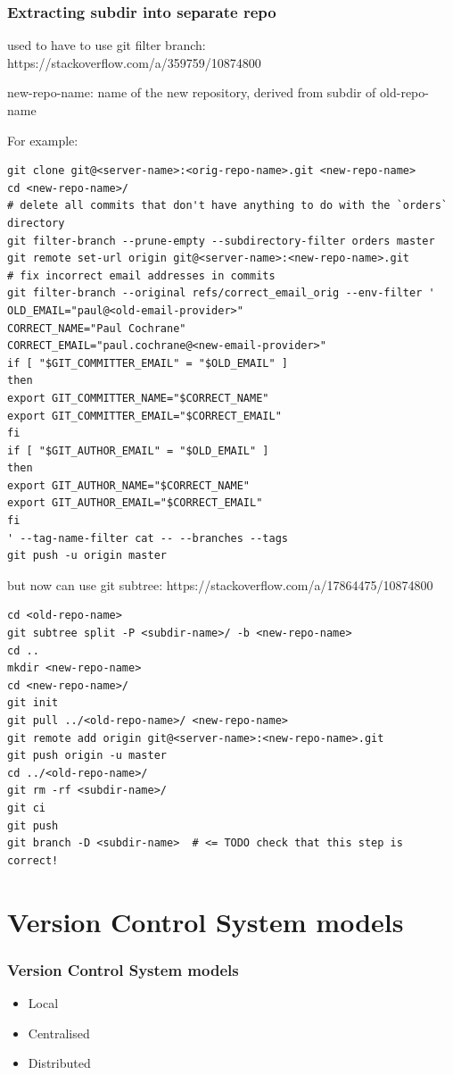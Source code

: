 \documentclass{git_course}
\begin{document}
\begin{frame}[fragile]
\frametitle{Extracting subdir into separate repo}
used to have to use git filter branch:
    https://stackoverflow.com/a/359759/10874800

    new-repo-name: name of the new repository, derived from subdir of
    old-repo-name

For example:
    \begin{lstlisting}
git clone git@<server-name>:<orig-repo-name>.git <new-repo-name>
cd <new-repo-name>/
# delete all commits that don't have anything to do with the `orders` directory
git filter-branch --prune-empty --subdirectory-filter orders master
git remote set-url origin git@<server-name>:<new-repo-name>.git
# fix incorrect email addresses in commits
git filter-branch --original refs/correct_email_orig --env-filter '
OLD_EMAIL="paul@<old-email-provider>"
CORRECT_NAME="Paul Cochrane"
CORRECT_EMAIL="paul.cochrane@<new-email-provider>"
if [ "$GIT_COMMITTER_EMAIL" = "$OLD_EMAIL" ]
then
export GIT_COMMITTER_NAME="$CORRECT_NAME"
export GIT_COMMITTER_EMAIL="$CORRECT_EMAIL"
fi
if [ "$GIT_AUTHOR_EMAIL" = "$OLD_EMAIL" ]
then
export GIT_AUTHOR_NAME="$CORRECT_NAME"
export GIT_AUTHOR_EMAIL="$CORRECT_EMAIL"
fi
' --tag-name-filter cat -- --branches --tags
git push -u origin master
    \end{lstlisting}

but now can use git subtree:
    https://stackoverflow.com/a/17864475/10874800

\begin{lstlisting}
cd <old-repo-name>
git subtree split -P <subdir-name>/ -b <new-repo-name>
cd ..
mkdir <new-repo-name>
cd <new-repo-name>/
git init
git pull ../<old-repo-name>/ <new-repo-name>
git remote add origin git@<server-name>:<new-repo-name>.git
git push origin -u master
cd ../<old-repo-name>/
git rm -rf <subdir-name>/
git ci
git push
git branch -D <subdir-name>  # <= TODO check that this step is correct!
\end{lstlisting}
\end{frame}

\appendix

\section{Version Control System models}

\begin{frame}
    \frametitle{Version Control System models}
    \begin{itemize}
        \item Local
        \item Centralised
        \item Distributed
    \end{itemize}
\end{frame}
\end{document}

